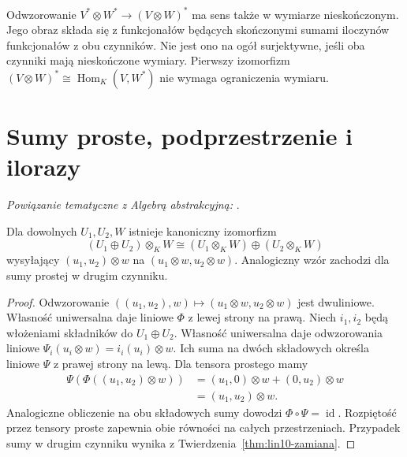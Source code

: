 \begin{uwaga}
\label{rem:lin10-dual-nieskonczony}
Odwzorowanie
\(V^*\otimes W^*\to(V\otimes W)^*\)
ma sens także w wymiarze
nieskończonym. Jego obraz
składa się z funkcjonałów
będących skończonymi sumami
iloczynów funkcjonałów
z obu czynników.
Nie jest ono na ogół surjektywne,
jeśli oba czynniki mają
nieskończone wymiary.
Pierwszy izomorfizm
\((V\otimes W)^*
\cong\operatorname{Hom}_K(V,W^*)\)
nie wymaga ograniczenia wymiaru.
\end{uwaga}

\section{Sumy proste, podprzestrzenie i ilorazy}
\label{sec:lin10-ilorazy}

\noindent\emph{Powiązanie tematyczne z Algebrą abstrakcyjną:} .


\begin{twierdzenie}
\label{thm:lin10-suma-prosta}
Dla dowolnych \(U_1,U_2,W\)
istnieje kanoniczny izomorfizm
\[
 (U_1\oplus U_2)\otimes_KW
 \cong (U_1\otimes_KW)\oplus(U_2\otimes_KW)
\]
wysyłający
\((u_1,u_2)\otimes w\)
na
\((u_1\otimes w,u_2\otimes w)\).
Analogiczny wzór zachodzi
dla sumy prostej w drugim czynniku.
\end{twierdzenie}
\begin{proof}
Odwzorowanie
\(((u_1,u_2),w)\mapsto
(u_1\otimes w,u_2\otimes w)\)
jest dwuliniowe.
Własność uniwersalna
daje liniowe \(\Phi\)
z lewej strony na prawą.
Niech \(i_1,i_2\)
będą włożeniami składników
do \(U_1\oplus U_2\).
Własność uniwersalna daje
odwzorowania liniowe
\(\Psi_i(u_i\otimes w)=i_i(u_i)\otimes w\).
Ich suma na dwóch składowych
określa liniowe \(\Psi\)
z prawej strony na lewą.
Dla tensora prostego mamy
\[
 \begin{aligned}
 \Psi(\Phi((u_1,u_2)\otimes w))
 &=(u_1,0)\otimes w+(0,u_2)\otimes w\\
 &=(u_1,u_2)\otimes w.
 \end{aligned}
\]
Analogiczne obliczenie
na obu składowych sumy
dowodzi \(\Phi\circ\Psi=\operatorname{id}\).
Rozpiętość przez tensory proste
zapewnia obie równości na
całych przestrzeniach.
Przypadek sumy w drugim
czynniku wynika z
Twierdzenia~\ref{thm:lin10-zamiana}.
\end{proof}

